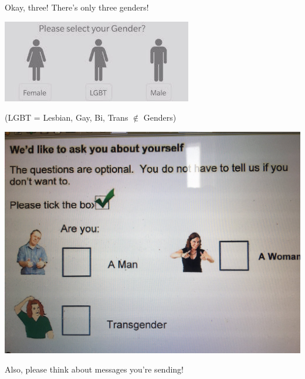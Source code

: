\documentclass[aspectratio=169,x11names]{beamer}
\begin{document}
\begin{frame}
\begin{center}
\huge
Okay, three! There's only three genders!
\end{center}
\end{frame}

\begin{frame}
\begin{center}
\includegraphics[height=0.6\textheight,keepaspectratio]{images/gender_m_lgbt_f.jpg} 
\bigskip\Large

(LGBT = Lesbian, Gay, Bi, Trans $\notin$ Genders)
\end{center}
\end{frame}

\begin{frame}
\begin{center}
\includegraphics[height=0.75\textheight,keepaspectratio]{images/mftrans.jpg} 
\bigskip\Large

Also, please think about messages you're sending!
\end{center}
\end{frame}
\end{document}
